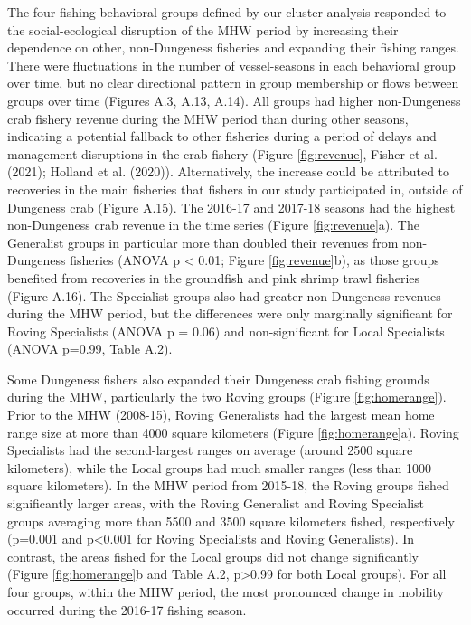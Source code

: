 \documentclass[]{elsarticle} %
\begin{document}
The four fishing behavioral groups defined by our cluster analysis
responded to the social-ecological disruption of the MHW period by
increasing their dependence on other, non-Dungeness fisheries and
expanding their fishing ranges. There were fluctuations in the number of
vessel-seasons in each behavioral group over time, but no clear
directional pattern in group membership or flows between groups over
time (Figures A.3, A.13, A.14). All groups had higher non-Dungeness crab
fishery revenue during the MHW period than during other seasons,
indicating a potential fallback to other fisheries during a period of
delays and management disruptions in the crab fishery (Figure
\ref{fig:revenue}, Fisher et al. (2021); Holland et al. (2020)).
Alternatively, the increase could be attributed to recoveries in the
main fisheries that fishers in our study participated in, outside of
Dungeness crab (Figure A.15). The 2016-17 and 2017-18 seasons had the
highest non-Dungeness crab revenue in the time series (Figure
\ref{fig:revenue}a). The Generalist groups in particular more than
doubled their revenues from non-Dungeness fisheries (ANOVA p \textless{}
0.01; Figure \ref{fig:revenue}b), as those groups benefited from
recoveries in the groundfish and pink shrimp trawl fisheries (Figure
A.16). The Specialist groups also had greater non-Dungeness revenues
during the MHW period, but the differences were only marginally
significant for Roving Specialists (ANOVA p = 0.06) and non-significant
for Local Specialists (ANOVA p=0.99, Table A.2).

Some Dungeness fishers also expanded their Dungeness crab fishing
grounds during the MHW, particularly the two Roving groups (Figure
\ref{fig:homerange}). Prior to the MHW (2008-15), Roving Generalists had
the largest mean home range size at more than 4000 square kilometers
(Figure \ref{fig:homerange}a). Roving Specialists had the second-largest
ranges on average (around 2500 square kilometers), while the Local
groups had much smaller ranges (less than 1000 square kilometers). In
the MHW period from 2015-18, the Roving groups fished significantly
larger areas, with the Roving Generalist and Roving Specialist groups
averaging more than 5500 and 3500 square kilometers fished, respectively
(p=0.001 and p\textless0.001 for Roving Specialists and Roving
Generalists). In contrast, the areas fished for the Local groups did not
change significantly (Figure \ref{fig:homerange}b and Table A.2,
p\textgreater0.99 for both Local groups). For all four groups, within
the MHW period, the most pronounced change in mobility occurred during
the 2016-17 fishing season.
\end{document}
